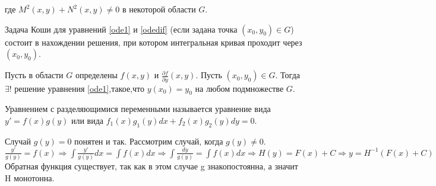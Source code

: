\documentclass[document.tex]{subfiles}
\begin{document}
где $M^2(x,y)+N^2(x,y)\neq0$ в некоторой области $G$.
\begin{definition}
Задача Коши для уравнений \ref{ode1} и \ref{odedif} (если задана точка $(x_0,y_0)\in G$) состоит в нахождении решения, при котором интегральная кривая проходит через $(x_0,y_0)$.
\end{definition}
\begin{theorem}
Пусть в области $G$ определены $f(x,y)$ и $\frac{\partial f}{\partial y} (x,y)$. Пусть $(x_0,y_0)\in G$. Тогда
$\exists!$ решение уравнения \ref{ode1},такое,что $y(x_0)=y_0$ на любом подмножестве $G$.
\end{theorem}
\begin{definition}
Уравнением с разделяющимися переменными называется уравнение вида $y'=f(x)g(y)$ или вида $f_1(x)g_1(y)dx+f_2(x)g_2(y)dy=0$.
\end{definition}
\begin{algorithm}
Случай $g(y) = 0$ понятен и так. Рассмотрим случай, когда $g(y)\neq0$.
$\frac{y'}{g(y)}=f(x) \Rightarrow \int \frac{y'}{g(y)}dx=\int f(x)dx \Rightarrow \int \frac{dy}{g(y)}=\int f(x)dx \Rightarrow H(y)=F(x)+C \Rightarrow y=H^{-1}(F(x)+C)$
Обратная функция существует, так как в этом случае g знакопостоянна, а значит H монотонна.
\end{algorithm}
\end{document}
